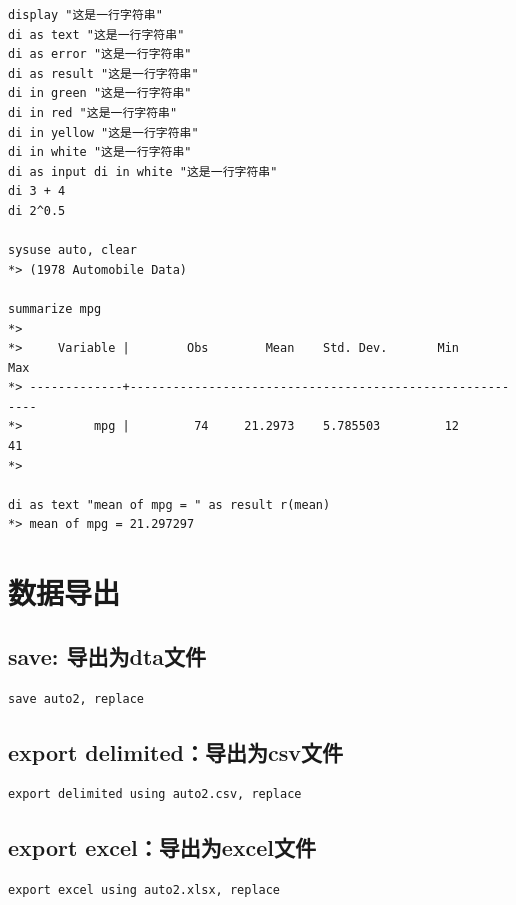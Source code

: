 \documentclass[]{ctexbook}
\begin{document}
\begin{lstlisting}
display "这是一行字符串"
di as text "这是一行字符串"
di as error "这是一行字符串"
di as result "这是一行字符串"
di in green "这是一行字符串"
di in red "这是一行字符串"
di in yellow "这是一行字符串"
di in white "这是一行字符串"
di as input di in white "这是一行字符串"
di 3 + 4
di 2^0.5

sysuse auto, clear
*> (1978 Automobile Data)

summarize mpg
*> 
*>     Variable |        Obs        Mean    Std. Dev.       Min        Max
*> -------------+---------------------------------------------------------
*>          mpg |         74     21.2973    5.785503         12         41
*> 

di as text "mean of mpg = " as result r(mean)
*> mean of mpg = 21.297297
\end{lstlisting}

\hypertarget{section-16}{%
\section{数据导出}\label{section-16}}

\hypertarget{save-dta}{%
\subsection{save: 导出为dta文件}\label{save-dta}}

\begin{lstlisting}
save auto2, replace
\end{lstlisting}

\hypertarget{export-delimitedcsv}{%
\subsection{export delimited：导出为csv文件}\label{export-delimitedcsv}}

\begin{lstlisting}
export delimited using auto2.csv, replace
\end{lstlisting}

\hypertarget{export-excelexcel}{%
\subsection{export excel：导出为excel文件}\label{export-excelexcel}}

\begin{lstlisting}
export excel using auto2.xlsx, replace
\end{lstlisting}
\end{document}
